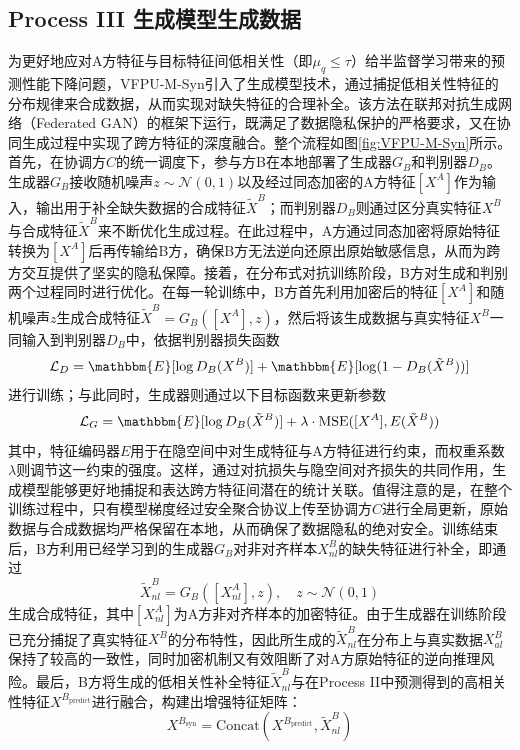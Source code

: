 \subsection{Process III 生成模型生成数据}
为更好地应对A方特征与目标特征间低相关性（即$\mu_q \leq \tau$）给半监督学习带来的预测性能下降问题，VFPU-M-Syn引入了生成模型技术，通过捕捉低相关性特征的分布规律来合成数据，从而实现对缺失特征的合理补全。该方法在联邦对抗生成网络（Federated GAN）的框架下运行，既满足了数据隐私保护的严格要求，又在协同生成过程中实现了跨方特征的深度融合。整个流程如图\ref{fig:VFPU-M-Syn}所示。首先，在协调方$C$的统一调度下，参与方B在本地部署了生成器$G_B$和判别器$D_B$。生成器$G_B$接收随机噪声$z \sim \mathcal{N}(0,1)$以及经过同态加密的A方特征$[X^A]$作为输入，输出用于补全缺失数据的合成特征$\tilde{X}^B$；而判别器$D_B$则通过区分真实特征$X^B$与合成特征$\tilde{X}^B$来不断优化生成过程。在此过程中，A方通过同态加密将原始特征转换为$[X^A]$后再传输给B方，确保B方无法逆向还原出原始敏感信息，从而为跨方交互提供了坚实的隐私保障。接着，在分布式对抗训练阶段，B方对生成和判别两个过程同时进行优化。在每一轮训练中，B方首先利用加密后的特征$[X^A]$和随机噪声$z$生成合成特征$\tilde{X}^B = G_B([X^A], z)$，然后将该生成数据与真实特征$X^B$一同输入到判别器$D_B$中，依据判别器损失函数  
\begin{equation}
	\mathcal{L}_D = \mathbbm{E}[\log D_B(X^B)] + \mathbbm{E}[\log(1 - D_B(\tilde{X}^B))]
\end{equation}
进行训练；与此同时，生成器则通过以下目标函数来更新参数  
\begin{equation}
	\mathcal{L}_G = \mathbbm{E}[\log D_B(\tilde{X}^B)] + \lambda \cdot \text{MSE}([X^A], E(\tilde{X}^B))
\end{equation}
其中，特征编码器$E$用于在隐空间中对生成特征与A方特征进行约束，而权重系数$\lambda$则调节这一约束的强度。这样，通过对抗损失与隐空间对齐损失的共同作用，生成模型能够更好地捕捉和表达跨方特征间潜在的统计关联。值得注意的是，在整个训练过程中，只有模型梯度经过安全聚合协议上传至协调方$C$进行全局更新，原始数据与合成数据均严格保留在本地，从而确保了数据隐私的绝对安全。训练结束后，B方利用已经学习到的生成器$G_B$对非对齐样本$X^B_{nl}$的缺失特征进行补全，即通过
\begin{equation}
	\tilde{X}^B_{nl} = G_B([X^A_{nl}], z), \quad z \sim \mathcal{N}(0,1)
\end{equation}
生成合成特征，其中$[X^A_{nl}]$为A方非对齐样本的加密特征。由于生成器在训练阶段已充分捕捉了真实特征$X^B$的分布特性，因此所生成的$\tilde{X}^B_{nl}$在分布上与真实数据$X^B_{al}$保持了较高的一致性，同时加密机制又有效阻断了对A方原始特征的逆向推理风险。最后，B方将生成的低相关性补全特征$\tilde{X}^B_{nl}$与在Process II中预测得到的高相关性特征$X^{B_{\text{predict}}}$进行融合，构建出增强特征矩阵：
\begin{equation}
	X^{B_{\text{syn}}} = \text{Concat}(X^{B_{\text{predict}}}, \tilde{X}^B_{nl})
\end{equation}

